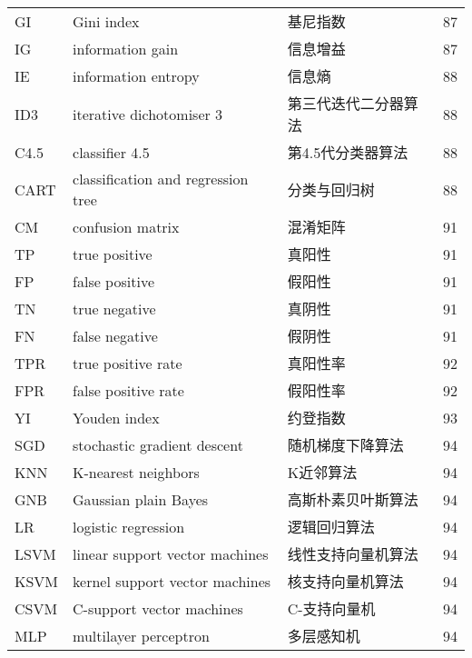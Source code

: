 \begin{center}
\begin{longtable}{m{2cm}m{7cm}m{5cm}m{1cm}<{\centering}}
        GI & Gini index & 基尼指数 & 87 \\
        IG & information gain & 信息增益 & 87 \\
        IE & information entropy & 信息熵 & 88 \\
        ID3 & iterative dichotomiser 3 & 第三代迭代二分器算法 & 88 \\
        C4.5 & classifier 4.5 & 第4.5代分类器算法 & 88 \\ 
        CART & classification and regression tree & 分类与回归树 & 88 \\
        CM & confusion matrix & 混淆矩阵 & 91 \\
        TP &  true positive & 真阳性 & 91 \\
        FP & false positive & 假阳性 & 91 \\
        TN & true negative & 真阴性 & 91 \\
        FN & false negative & 假阴性 & 91 \\
        TPR &  true positive rate & 真阳性率 & 92 \\
        FPR & false positive rate& 假阳性率 & 92 \\
        YI  & Youden index & 约登指数& 93 \\
        SGD & stochastic gradient descent & 随机梯度下降算法 & 94 \\
        KNN & K-nearest neighbors & K近邻算法 & 94 \\
        GNB & Gaussian plain Bayes & 高斯朴素贝叶斯算法 & 94 \\
        LR  & logistic regression  & 逻辑回归算法 & 94 \\
        LSVM & linear support vector machines & 线性支持向量机算法 & 94 \\
        KSVM & kernel support vector machines & 核支持向量机算法 & 94 \\
        CSVM & C-support vector machines & C-支持向量机 & 94 \\
        MLP & multilayer perceptron & 多层感知机 & 94 \\
	\end{longtable}
\end{center}